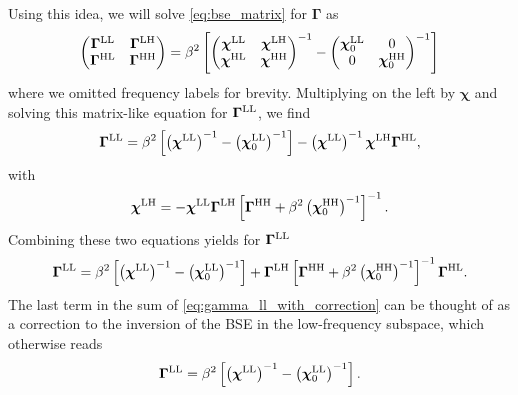 \documentclass[../../main.tex]{subfiles}
\begin{document}
Using this idea, we will solve \eqref{eq:bse_matrix} for $\bm\Gamma$ as
\begin{align}\label{eq:bse_block}
	\begin{pmatrix}
		\bm\Gamma^{\text{L}\text{L}} & \bm\Gamma^{\text{L}\text{H}} \\ \bm\Gamma^{\text{H}\text{L}} & \bm\Gamma^{\text{H}\text{H}}
	\end{pmatrix}=\beta^2\left [
	\begin{pmatrix}
		\bm\chi^{\text{L}\text{L}} & \bm\chi^{\text{L}\text{H}} \\ \bm\chi^{\text{H}\text{L}} & \bm\chi^{\text{H}\text{H}}
	\end{pmatrix}^{-1}-
	\begin{pmatrix}
		\bm\chi_{0}^{\text{L}\text{L}} & 0 \\ 0 & \bm\chi_{0}^{\text{H}\text{H}}
	\end{pmatrix}^{-1}\right ]
\end{align}
where we omitted frequency labels for brevity. Multiplying on the left by $\bm\chi$ and solving this matrix-like equation for $\bm\Gamma^{\text{L}\text{L}}$, we find
\begin{align}\label{eq:gamma_ll_with_correction_but_generalized_susc}
	\bm\Gamma^{\text{L}\text{L}}=\beta^2\left[\left (\bm\chi^{\text{L}\text{L}}\right )^{-1}-\left (\bm\chi_{0}^{\text{L}\text{L}}\right )^{-1}\right ]-\left (\bm\chi^{\text{L}\text{L}}\right )^{-1}\bm\chi^{\text{L}\text{H}}\bm\Gamma^{\text{H}\text{L}},
\end{align}
with
\begin{align}
	\bm\chi^{\text{L}\text{H}}=-\bm\chi^{\text{L}\text{L}}\bm\Gamma^{\text{L}\text{H}}\left [\bm\Gamma^{\text{H}\text{H}}+\beta^2 \left (\bm\chi_{0}^{\text{H}\text{H}}\right )^{-1}\right ]^{-1}.
\end{align}
Combining these two equations yields for $\bm\Gamma^{\text{L}\text{L}}$
\begin{align}\label{eq:gamma_ll_with_correction}
	\bm\Gamma^{\text{L}\text{L}}=\beta^2\left[\left (\bm\chi^{\text{L}\text{L}}\right )^{-1}-\left (\bm\chi_{0}^{\text{L}\text{L}}\right )^{-1}\right ]+\bm\Gamma^{\text{L}\text{H}}\left [\bm\Gamma^{\text{H}\text{H}}+\beta^2 \left (\bm\chi_{0}^{\text{H}\text{H}}\right )^{-1}\right ]^{-1}\bm\Gamma^{\text{H}\text{L}}.
\end{align}
The last term in the sum of \eqref{eq:gamma_ll_with_correction} can be thought of as a correction to the inversion of the BSE in the low-frequency subspace, which otherwise reads
\begin{align}
	\bm\Gamma^{\text{L}\text{L}}=\beta^2\left[\left (\bm\chi^{\text{L}\text{L}}\right )^{-1}-\left (\bm\chi_{0}^{\text{L}\text{L}}\right )^{-1}\right ].
\end{align}
\end{document}
